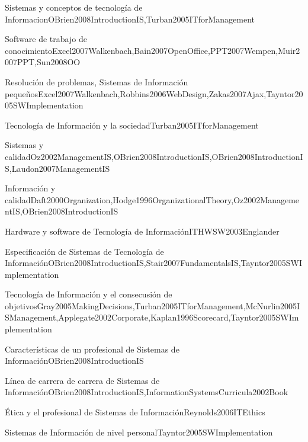 \begin{LU1}{Sistemas y conceptos de tecnología de Informacion}{OBrien2008IntroductionIS,Turban2005ITforManagement}{}
\begin{LU2}{Software de trabajo de conocimiento}{Excel2007Walkenbach,Bain2007OpenOffice,PPT2007Wempen,Muir2007PPT,Sun2008OO}{}
\begin{LU3}{Resolución de problemas, Sistemas de Información pequeños}{Excel2007Walkenbach,Robbins2006WebDesign,Zakas2007Ajax,Tayntor2005SWImplementation}{}
\begin{LU4}{Tecnología de Información y la sociedad}{Turban2005ITforManagement}{}
\begin{LU5}{Sistemas y calidad}{Oz2002ManagementIS,OBrien2008IntroductionIS,OBrien2008IntroductionIS,Laudon2007ManagementIS}{}
\begin{LU6}{Información y calidad}{Daft2000Organization,Hodge1996OrganizationalTheory,Oz2002ManagementIS,OBrien2008IntroductionIS}{}
\begin{LU7}{Hardware y software de Tecnología de Información}{ITHWSW2003Englander}{}
\begin{LU8}{Especificación de Sistemas de Tecnología de Información}{OBrien2008IntroductionIS,Stair2007FundamentalsIS,Tayntor2005SWImplementation}{}
\begin{LU9}{Tecnología de Información y el consecusión de objetivos}{Gray2005MakingDecisions,Turban2005ITforManagement,McNurlin2005ISManagement,Applegate2002Corporate,Kaplan1996Scorecard,Tayntor2005SWImplementation}{}
\begin{LU10}{Características de un profesional de Sistemas de Información}{OBrien2008IntroductionIS}{}
\begin{LU11}{Línea de carrera de carrera de Sistemas de Información}{OBrien2008IntroductionIS,InformationSystemsCurricula2002Book}{}
\begin{LU12}{Ética y el profesional de Sistemas de Información}{Reynolds2006ITEthics}{}
\begin{LU13}{Sistemas de Información de nivel personal}{Tayntor2005SWImplementation}{}
\end{LU13}
\end{LU12}
\end{LU11}
\end{LU10}
\end{LU9}
\end{LU8}
\end{LU7}
\end{LU6}
\end{LU5}
\end{LU4}
\end{LU3}
\end{LU2}
\end{LU1}
